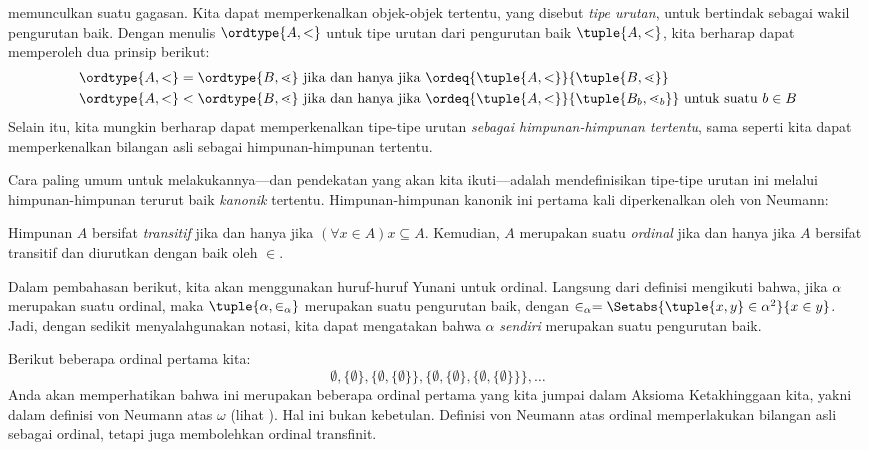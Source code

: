 \documentclass[../../../include/open-logic-section]{subfiles}
\begin{document}

 memunculkan suatu gagasan.
Kita dapat memperkenalkan objek-objek tertentu, yang disebut \emph{tipe
urutan}, untuk bertindak sebagai wakil pengurutan baik. Dengan menulis
$\ordtype{A, <}$ untuk tipe urutan dari pengurutan baik $\tuple{A, <}$, kita
berharap dapat memperoleh dua prinsip berikut:
\begin{align*}
	\ordtype{A, <} = \ordtype{B, \lessdot} &
	\text{ jika dan hanya jika } \ordeq{\tuple{A, <}}{\tuple{B, \lessdot}}\\
	\ordtype{A, <} < \ordtype{B, \lessdot}&
	\text{ jika dan hanya jika }\ordeq{\tuple{A, <}}{\tuple{B_b, \lessdot_b}}\text{ untuk suatu }b \in B
\end{align*}
Selain itu, kita mungkin berharap dapat memperkenalkan tipe-tipe urutan
\emph{sebagai himpunan-himpunan tertentu}, sama seperti kita dapat
memperkenalkan bilangan asli sebagai himpunan-himpunan tertentu.

Cara paling umum untuk melakukannya---dan pendekatan yang akan kita
ikuti---adalah mendefinisikan tipe-tipe urutan ini melalui
himpunan-himpunan terurut baik \emph{kanonik} tertentu. Himpunan-himpunan
kanonik ini pertama kali diperkenalkan oleh von Neumann:

\begin{defn}
Himpunan $A$ bersifat \emph{transitif} jika dan hanya jika $(\forall x \in
A)x \subseteq A$. Kemudian, $A$ merupakan suatu \emph{ordinal} jika dan hanya
jika $A$ bersifat transitif dan diurutkan dengan baik oleh $\in$.
\end{defn}
\noindent
Dalam pembahasan berikut, kita akan menggunakan huruf-huruf Yunani untuk
ordinal. Langsung dari definisi mengikuti bahwa, jika $\alpha$ merupakan
suatu ordinal, maka $\tuple{\alpha, \in_\alpha}$ merupakan suatu pengurutan
baik, dengan $\in_\alpha = \Setabs{\tuple{x, y} \in \alpha^2}{x \in y}$.
Jadi, dengan sedikit menyalahgunakan notasi, kita dapat mengatakan bahwa
$\alpha$ \emph{sendiri} merupakan suatu pengurutan baik.

Berikut beberapa ordinal pertama kita:
\[
	\emptyset, \{\emptyset\},
	\{\emptyset, \{\emptyset\}\},
	\{\emptyset, \{\emptyset\}, \{\emptyset, \{\emptyset\}\}\}, \ldots
\]
Anda akan memperhatikan bahwa ini merupakan beberapa ordinal pertama yang
kita jumpai dalam Aksioma Ketakhinggaan kita, yakni dalam definisi von
Neumann atas $\omega$ (lihat ). Hal ini
bukan kebetulan. Definisi von Neumann atas ordinal memperlakukan bilangan
asli sebagai ordinal, tetapi juga membolehkan ordinal transfinit.
\end{document}
